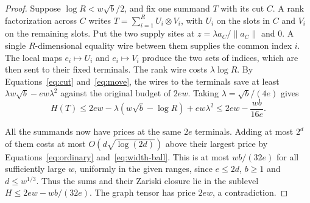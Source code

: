 \begin{proof}
Suppose $\log R< w\sqrt b/2$, and fix one summand $T$ with its cut
$C$. A rank factorization across $C$ writes
$T=\sum_{i=1}^R U_i\otimes V_i$, with $U_i$ on the slots in $C$ and
$V_i$ on the remaining slots. Put the two supply sites at
$z=\lambda a_C/\|a_C\|$ and $0$. A single $R$-dimensional equality
wire between them supplies the common index $i$. The local maps
$e_i\mapsto U_i$ and $e_i\mapsto V_i$ produce the two sets of indices,
which are then sent to their fixed terminals. The rank wire costs
$\lambda\log R$. By Equations~\eqref{eq:cut} and~\eqref{eq:move},
the wires to the terminals save at least $\lambda w\sqrt b-ew\lambda^2$
against the original budget of $2ew$. Taking $\lambda=\sqrt b/(4e)$
gives
\[
 H(T)\le 2ew-\lambda(w\sqrt b-\log R)+ew\lambda^2
      \le 2ew-\frac{wb}{16e}.
\]

All the summands now have prices at the same $2e$ terminals. Adding
at most $2^d$ of them costs at most $O(d\sqrt{\log(2d)})$ above their
largest price by Equations~\eqref{eq:ordinary} and~\eqref{eq:width-ball}.
This is at most $wb/(32e)$ for all sufficiently large $w$, uniformly
in the given ranges, since $e\le2d$, $b\ge1$ and $d\le w^{1/3}$.
Thus the sums and their Zariski closure lie in the sublevel
$H\le2ew-wb/(32e)$. The graph tensor has price $2ew$, a contradiction.
\end{proof}

